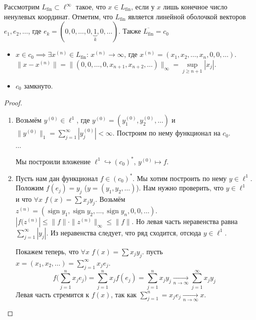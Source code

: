 \documentclass[11pt,openany,a4paper]{scrartcl}
\theoremstyle{plain}
\theoremstyle{definition}
\newcommand{\underto}[1]{\xrightarrow[#1]{}}
\DeclareMathOperator{\sign}{sign}
\begin{document}
Рассмотрим $L_\text{fin} \subset \ell^\infty$ такое, что $x \in L_\text{fin}$,
если у $x$ лишь конечное число ненулевых координат. Отметим, что $L_\text{fin}$
является линейной оболочкой векторов $e_1, e_2, \ldots$, где
$e_k = (0, 0, \ldots, 0,\underbrace{1}_{k}, 0, \ldots)$. Также
$\overline{L_\text{fin}} = c_0$
\begin{itemize}
    \item $x \in c_0 \implies \exists x^{(n)} \in L_\text{fin}$: $x^{(n)} \to 
    \infty$, где $x^{(n)} = (x_1, x_2, \ldots, x_n, 0, 0, \ldots)$.
    $\|x - x^{(n)}\| = \|(0, 0, \ldots, 0, x_{n+1}, x_{n+2}, \ldots)\|_\infty =
    \sup\limits_{j \geqslant n+1}|x_j|$.
    \item $c_0$ замкнуто.
\end{itemize}

\begin{proof}
\mbox{}
    \begin{enumerate}
        \item Возьмём $y^{(0)} \in \ell^1$, где
        $y^{(0)} = (y_1^{(0)}, y_2^{(0)}, \ldots)$
        и $\|y^{(0)}\|_1 = \sum\limits_{j=1}^\infty |y_j^{(0)}| < \infty$.
        Построим по нему функционал на $c_0$.
        
        $\cdots$
        
        Мы построили вложение $\ell^1 \hookrightarrow (c_0)^\ast$, $y^{(0)} 
        \mapsto f$.
        \item Пусть нам дан функционал $f \in (c_0)^\ast$. Мы хотим построить по
        нему $y \in \ell^1$. Положим $f(e_j) = y_j$ ($y = (y_1, y_2, \ldots)$).
        Нам нужно проверить, что $y \in \ell^1$ и что
        $\forall x$ $f(x) = \sum x_jy_j$.
        Возьмём $z^{(n)} =
        (\sign y_1, \sign y_2, \ldots, \sign y_n, 0, 0,\ldots)$.
        $|f(z^{(n)}| \leqslant \|f\|\cdot \|z^{(n)}\|_\infty \leqslant \|f\|$.
        Но левая часть неравенства равна $\sum\limits_{j=1}^\infty |y_j|$. Из
        неравенства следует, что ряд сходится, отсюда $y \in \ell^1$.
        
        Покажем теперь, что $\forall x$ $f(x) = \sum x_jy_j$.
        пусть $x = (x_1, x_2, \ldots) = \sum\limits_{j=1}^\infty x_je_j$.
        $$
        f\bigg(\sum\limits_{j=1}^n x_je_j\bigg) = \sum\limits_{j=1}^n x_jf(e_j) =
        \sum\limits_{j=1}^n x_jy_j \underto{n \to \infty} \sum\limits_{j=1}^\infty
        x_jy_j
        $$
        Левая часть стремится к $f(x)$, так как $\sum\limits_{j=1}^n = x_je_j
        \underto{n \to \infty} x$.
    \end{enumerate}
\end{proof}
\end{document}
